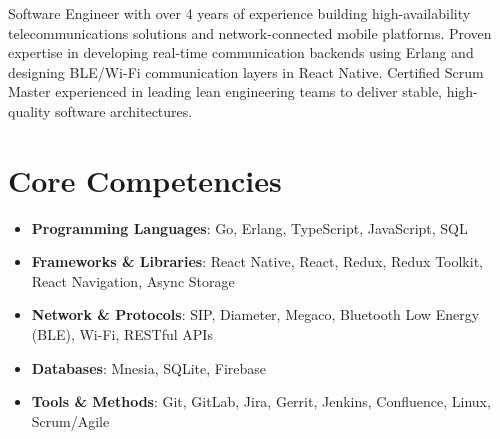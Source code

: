 \documentclass[11pt,a4paper,sans]{moderncv}
\begin{document}
\makecvtitle


\vspace{-10pt}
\small{Software Engineer with over 4 years of experience building high-availability telecommunications solutions and network-connected mobile platforms. Proven expertise in developing real-time communication backends using Erlang and designing BLE/Wi-Fi communication layers in React Native. Certified Scrum Master experienced in leading lean engineering teams to deliver stable, high-quality software architectures.}


\section{Core Competencies}
\vspace{1pt}
\begin{itemize}

\item \textbf{Programming Languages}: Go, Erlang, TypeScript, JavaScript, SQL

\item \textbf{Frameworks \& Libraries}: React Native, React, Redux, Redux Toolkit, React Navigation, Async Storage

\item \textbf{Network \& Protocols}: SIP, Diameter, Megaco, Bluetooth Low Energy (BLE), Wi-Fi, RESTful APIs

\item \textbf{Databases}: Mnesia, SQLite, Firebase

\item \textbf{Tools \& Methods}: Git, GitLab, Jira, Gerrit, Jenkins, Confluence, Linux, Scrum/Agile

\end{itemize}

\end{document}
